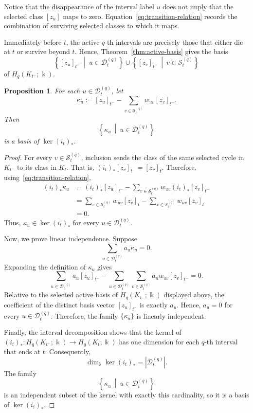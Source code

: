 \documentclass[11pt]{article}
\theoremstyle{paperdefinition}
\theoremstyle{paperplain}
\newtheorem{proposition}[definition]{Proposition}
\theoremstyle{paperremark}
\begin{document}
Notice that the disappearance of the interval label $u$ does not imply that the selected class $[z_u]$ maps to zero. Equation~\eqref{eq:transition-relation} records the combination of surviving selected classes to which it maps.

Immediately before $t$, the active $q$-th intervals are precisely those that either die at $t$ or survive beyond $t$. Hence, Theorem~\ref{thm:active-basis} gives the basis
\[
\left\{[z_u]_{t^-} \ \middle|\ u\in\mathcal D_t^{(q)} \right\} \cup \left\{[z_v]_{t^-} \ \middle|\ v\in\mathcal S_t^{(q)}\right\}
\]
of
$H_q(K_{t^-};\Bbbk)$.

\begin{proposition}
\label{prop:transition-kernel-basis}
For each $u\in\mathcal D_t^{(q)}$, let
\[
\kappa_u := [z_u]_{t^-} - \sum_{v\in\mathcal S_t^{(q)}}w_{uv}[z_v]_{t^-}.
\]
Then
\[
\left\{\kappa_u \ \middle|\ u\in\mathcal D_t^{(q)}\right\}
\]
is a basis of $\ker(i_t)_*$.
\end{proposition}

\begin{proof}
For every $v\in\mathcal S_t^{(q)}$, inclusion sends the class of the same selected cycle in $K_{t^-}$ to its class in $K_t$. That is, $(i_t)_*[z_v]_{t^-} = [z_v]_t$. Therefore, using~\eqref{eq:transition-relation},
\[
\begin{aligned}
(i_t)_*\kappa_u &= (i_t)_*[z_u]_{t^-} - \sum_{v\in\mathcal S_t^{(q)}}w_{uv}(i_t)_*[z_v]_{t^-}\\
&= \sum_{v\in\mathcal S_t^{(q)}}w_{uv}[z_v]_t - \sum_{v\in\mathcal S_t^{(q)}}w_{uv}[z_v]_t\\
&=0.
\end{aligned}
\]
Thus, $\kappa_u\in\ker(i_t)_*$ for every $u\in\mathcal D_t^{(q)}$.

Now, we prove linear independence. Suppose
\[
\sum_{u\in\mathcal D_t^{(q)}}a_u\kappa_u = 0.
\]
Expanding the definition of $\kappa_u$ gives
\[
\sum_{u\in\mathcal D_t^{(q)}}a_u[z_u]_{t^-} - \sum_{u\in\mathcal D_t^{(q)}}\sum_{v\in\mathcal S_t^{(q)}}a_uw_{uv}[z_v]_{t^-} = 0.
\]
Relative to the selected active basis of $H_q(K_{t^-};\Bbbk)$ displayed above, the coefficient of the distinct basis vector $[z_u]_{t^-}$ is exactly $a_u$. Hence, $a_u=0$ for every $u\in\mathcal D_t^{(q)}$. Therefore, the family $\{\kappa_u\}$ is linearly independent.

Finally, the interval decomposition shows that the kernel of $(i_t)_*: H_q(K_{t^-};\Bbbk) \longrightarrow H_q(K_t;\Bbbk)$ has one dimension for each $q$-th interval that ends at $t$. Consequently,
\[
\dim_{\Bbbk}\ker(i_t)_* = \left|\mathcal D_t^{(q)}\right|.
\]
The family
\[
\left\{\kappa_u \ \middle|\ u\in\mathcal D_t^{(q)} \right\}
\]
is an independent subset of the kernel with exactly this cardinality, so it is a basis of $\ker(i_t)_*$.
\end{proof}
\end{document}
